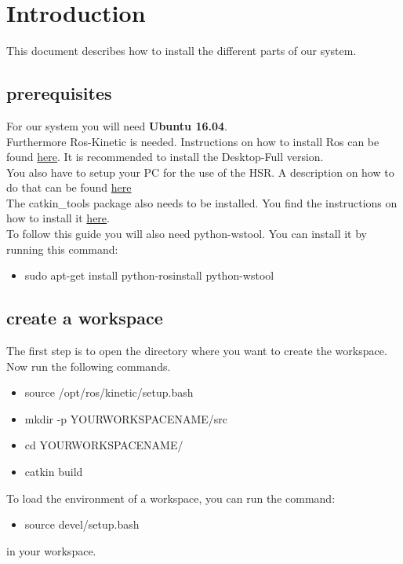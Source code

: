 \documentclass[main.tex]{subfiles}
\begin{document}
\newpage
	\section{Introduction}
	This document describes how to install the different parts of our system.
	
	\subsection{prerequisites}
	
	For our system you will need \textbf{Ubuntu 16.04}.\\
	Furthermore Ros-Kinetic is needed. Instructions on how to install Ros can be found \href{http://wiki.ros.org/kinetic/Installation/Ubuntu}{here}. It is recommended to install the Desktop-Full version.\\
	You also have to setup your PC for the use of the HSR.
	A description on how to do that can be found \href{https://docs.hsr.io/manual_en/howto/pc_install.html}{here}\\
	The catkin\_tools package also needs to be installed. You find the instructions on how to install it \href{https://catkin-tools.readthedocs.io/en/latest/installing.html}{here}.\\
	To follow this guide you will also need python-wstool.
	You can install it by running this command:
	\begin{itemize}
	\item sudo apt-get install python-rosinstall python-wstool
	\end{itemize}
	
	
	\subsection{create a workspace}
	The first step is to open the directory where you want to create the workspace.\\
	Now run the following commands.
	\begin{itemize}
	\item source /opt/ros/kinetic/setup.bash
	\item mkdir -p YOURWORKSPACENAME/src
	\item cd YOURWORKSPACENAME/
	\item catkin build 
	\end{itemize}
	
	To load the environment of a workspace, you can run the command:
	\begin{itemize}
	\item source devel/setup.bash
	\end{itemize}
	in your workspace.
	
	
\end{document}
